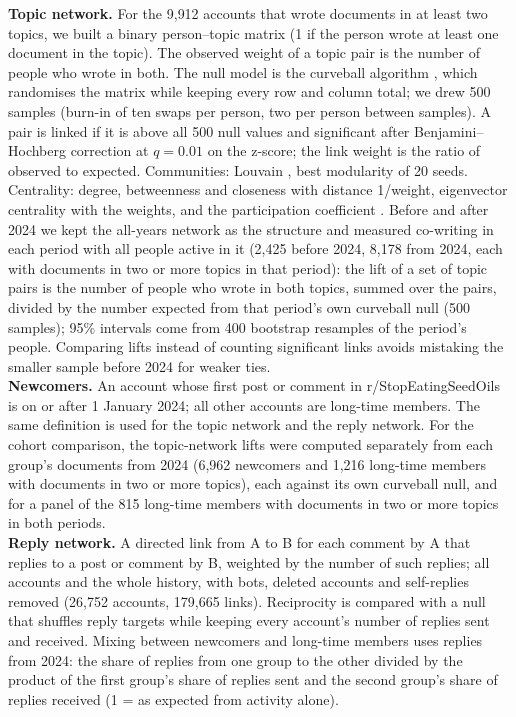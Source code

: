 
\textbf{Topic network.} For the 9{,}912 accounts that wrote documents in at least two topics, we built a binary person--topic matrix (1 if the person wrote at least one document in the topic). The observed weight of a topic pair is the number of people who wrote in both. The null model is the curveball algorithm \cite{strona2014curveball}, which randomises the matrix while keeping every row and column total; we drew 500 samples (burn-in of ten swaps per person, two per person between samples). A pair is linked if it is above all 500 null values and significant after Benjamini--Hochberg correction \cite{benjamini1995fdr} at $q=0.01$ on the z-score; the link weight is the ratio of observed to expected. Communities: Louvain \cite{blondel2008louvain}, best modularity of 20 seeds. Centrality: degree, betweenness and closeness with distance 1/weight, eigenvector centrality with the weights, and the participation coefficient \cite{guimera2005cartography}. Before and after 2024 we kept the all-years network as the structure and measured co-writing in each period with all people active in it (2{,}425 before 2024, 8{,}178 from 2024, each with documents in two or more topics in that period): the lift of a set of topic pairs is the number of people who wrote in both topics, summed over the pairs, divided by the number expected from that period's own curveball null (500 samples); 95\% intervals come from 400 bootstrap resamples of the period's people. Comparing lifts instead of counting significant links avoids mistaking the smaller sample before 2024 for weaker ties. \\
\textbf{Newcomers.} An account whose first post or comment in r/StopEatingSeedOils is on or after 1 January 2024; all other accounts are long-time members. The same definition is used for the topic network and the reply network. For the cohort comparison, the topic-network lifts were computed separately from each group's documents from 2024 (6{,}962 newcomers and 1{,}216 long-time members with documents in two or more topics), each against its own curveball null, and for a panel of the 815 long-time members with documents in two or more topics in both periods. \\
\textbf{Reply network.} A directed link from A to B for each comment by A that replies to a post or comment by B, weighted by the number of such replies; all accounts and the whole history, with bots, deleted accounts and self-replies removed (26{,}752 accounts, 179{,}665 links). Reciprocity is compared with a null that shuffles reply targets while keeping every account's number of replies sent and received. Mixing between newcomers and long-time members uses replies from 2024: the share of replies from one group to the other divided by the product of the first group's share of replies sent and the second group's share of replies received (1 = as expected from activity alone).

